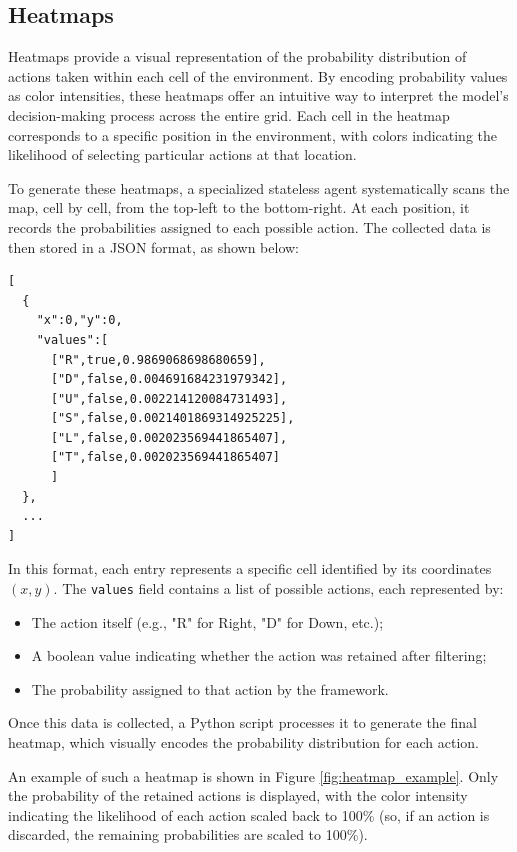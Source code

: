 \subsection{Heatmaps}

Heatmaps provide a visual representation of the probability distribution of
actions taken within each cell of the environment. By encoding probability values
as color intensities, these heatmaps offer an intuitive way to interpret the
model's decision-making process across the entire grid. Each cell in the heatmap
corresponds to a specific position in the environment, with colors indicating
the likelihood of selecting particular actions at that location.

To generate these heatmaps, a specialized stateless agent systematically scans the
map, cell by cell, from the top-left to the bottom-right. At each position, it records
the probabilities assigned to each possible action. The collected data is then
stored in a JSON format, as shown below:

\begin{verbatim}
[
  {
    "x":0,"y":0,
    "values":[
      ["R",true,0.9869068698680659],
      ["D",false,0.004691684231979342],
      ["U",false,0.002214120084731493],
      ["S",false,0.0021401869314925225],
      ["L",false,0.002023569441865407],
      ["T",false,0.002023569441865407]
      ]
  },
  ...
]
\end{verbatim}

In this format, each entry represents a specific cell identified by its coordinates
$(x,y)$. The \texttt{values} field contains a list of possible actions, each
represented by:
\begin{itemize}
  \item The action itself (e.g., "R" for Right, "D" for Down, etc.);

  \item A boolean value indicating whether the action was retained after filtering;

  \item The probability assigned to that action by the framework.
\end{itemize}
Once this data is collected, a Python script processes it to generate the final
heatmap, which visually encodes the probability distribution for each action.

An example of such a heatmap is shown in Figure \ref{fig:heatmap_example}. Only
the probability of the retained actions is displayed, with the color intensity indicating
the likelihood of each action scaled back to 100\% (so, if an action is
discarded, the remaining probabilities are scaled to 100\%).

